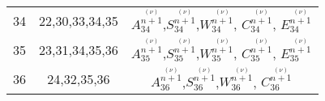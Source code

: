 \begin{center}
\begin{longtable}[htbp]{c c c}
		34	&	22,30,33,34,35	&	$A^{\stackrel{(\nu)}{n+1}}_{34}$,$S^{\stackrel{(\nu)}{n+1}}_{34}$,$W^{\stackrel{(\nu)}{n+1}}_{34}$, $C^{\stackrel{(\nu)}{n+1}}_{34}$, $E^{\stackrel{(\nu)}{n+1}}_{34}$	\\
		35	&	23,31,34,35,36	&	$A^{\stackrel{(\nu)}{n+1}}_{35}$,$S^{\stackrel{(\nu)}{n+1}}_{35}$,$W^{\stackrel{(\nu)}{n+1}}_{35}$, $C^{\stackrel{(\nu)}{n+1}}_{35}$, $E^{\stackrel{(\nu)}{n+1}}_{35}$	\\
		36	&	24,32,35,36	&	$A^{\stackrel{(\nu)}{n+1}}_{36}$,$S^{\stackrel{(\nu)}{n+1}}_{36}$,$W^{\stackrel{(\nu)}{n+1}}_{36}$, $C^{\stackrel{(\nu)}{n+1}}_{36}$ \\
	\end{longtable}
\end{center}